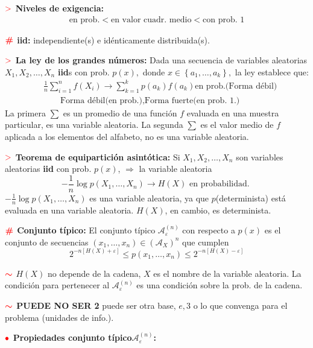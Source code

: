 \documentclass[%
 reprint,
 amsmath,amssymb,
 aps,
]{revtex4-1}
\begin{document}
\textbf{$\textcolor{red}{\mathbf{>}}$ Niveles de exigencia:}
$$
\begin{aligned}
  \text{en prob.} < 
  \text{en valor cuadr. medio} < 
  \text{con prob. 1}
\end{aligned}
$$

\textbf{$\color{red}{\textbf{\#}}$ iid:} independiente(s) e idénticamente distribuida(s).

\textbf{$\textcolor{red}{\mathbf{>}}$ La ley de los grandes números:} 
Dada una secuencia de variables aleatorias $X_{1}, X_{2}, \ldots, X_{n}$ \textbf{iid}s con prob. $p(x),$ donde $x \in\left\{a_{1}, \ldots, a_{k}\right\},$ la ley establece que:
$$
\begin{aligned}
  &\frac{1}{n} \sum_{i=1}^{n} f\left(X_{i}\right) 
  \rightarrow
  \sum_{k=1}^{k} p\left(a_{k}\right) f\left(a_{k}\right) \text{en prob.} \text{(Forma débil)}\\
  &\qquad \text{Forma débil}
  \text{(en prob.)} 
  , 
  \text{Forma fuerte}
  \text{(en prob. 1.)} 
\end{aligned}
$$
La primera $\sum$ es un promedio de una función $f$ evaluada en una muestra particular, es
una variable aleatoria. La segunda $\sum$ es el valor medio de $f$ aplicada a los elementos del
alfabeto, no es una variable aleatoria. 

\textbf{$\textcolor{red}{\mathbf{>}}$ Teorema de equipartición asintótica:}
Si $X_{1}, X_{2}, \ldots, X_{n}$ son variables aleatorias \textbf{iid} con prob.
$p(x)$, $\Rightarrow$ la variable aleatoria
$$
-\frac{1}{n} \log p\left(X_{1}, \ldots, X_{n}\right) \rightarrow H(X) \text { en probabilidad. }
$$
$-\frac{1}{n} \log p\left(X_{1}, \ldots, X_{n}\right)$ es una variable aleatoria, ya que $p$(determinista) está evaluada en una variable aleatoria. $H(X)$, en
cambio, es determinista.


\textbf{$\color{red}{\textbf{\#}}$ Conjunto típico:} 
El conjunto típico $\mathcal{A}_{\varepsilon}^{(n)}$ con respecto a $p(x)$ es el conjunto de secuencias $\left(x_{1}, \ldots, x_{n}\right) \in\left(\mathcal{A}_{X}\right)^{n}$
que cumplen
$$
2^{-n[H(X)+\varepsilon]} \leq p\left(x_{1}, \ldots, x_{n}\right) \leq 2^{-n[H(X)-\varepsilon]}
$$

\textbf{$\textcolor{red}{\color{red}{\boldsymbol{\sim}}}$} 
$H(X)$ no depende de la cadena, $X$ es el nombre de la variable aleatoria. La condición para pertenecer al $\mathcal{A}_{\varepsilon}^{(n)}$ es una condición sobre la prob. de la cadena.

\textbf{$\textcolor{red}{\color{red}{\boldsymbol{\sim}}}$ PUEDE NO SER 2} 
puede ser otra base, $e,3$ o lo que convenga para el problema (unidades de info.).

\textbf{$\color{red}{\bullet}$ Propiedades conjunto típico$\mathcal{A}_{\varepsilon}^{(n)}$:}
\end{document}
